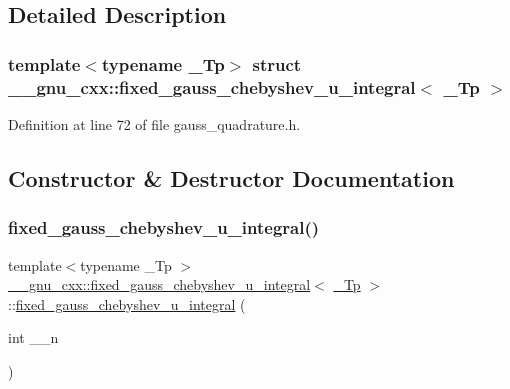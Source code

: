 \subsection{Detailed Description}
\subsubsection*{template$<$typename \+\_\+\+Tp$>$\newline
struct \+\_\+\+\_\+gnu\+\_\+cxx\+::fixed\+\_\+gauss\+\_\+chebyshev\+\_\+u\+\_\+integral$<$ \+\_\+\+Tp $>$}



Definition at line 72 of file gauss\+\_\+quadrature.\+h.



\subsection{Constructor \& Destructor Documentation}
\mbox{\label{struct____gnu__cxx_1_1fixed__gauss__chebyshev__u__integral_a4e0aa98609c6a0621ebdb09ddfa27116}} 
\subsubsection{\texorpdfstring{fixed\+\_\+gauss\+\_\+chebyshev\+\_\+u\+\_\+integral()}{fixed\_gauss\_chebyshev\_u\_integral()}}
{\footnotesize\ttfamily template$<$typename \+\_\+\+Tp $>$ \\
\hyperlink{struct____gnu__cxx_1_1fixed__gauss__chebyshev__u__integral}{\+\_\+\+\_\+gnu\+\_\+cxx\+::fixed\+\_\+gauss\+\_\+chebyshev\+\_\+u\+\_\+integral}$<$ \hyperlink{namespace____gnu__cxx_a3b19a9c800ca194374ef9172290f7d79}{\+\_\+\+Tp} $>$\+::\hyperlink{struct____gnu__cxx_1_1fixed__gauss__chebyshev__u__integral}{fixed\+\_\+gauss\+\_\+chebyshev\+\_\+u\+\_\+integral} (\begin{DoxyParamCaption}\item[{int}]{\+\_\+\+\_\+n }\end{DoxyParamCaption})\hspace{0.3cm}{\ttfamily [explicit]}}

